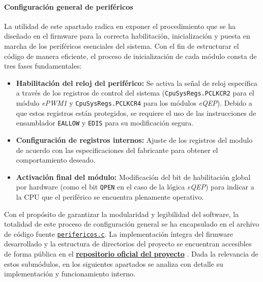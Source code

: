\documentclass[11pt,fleqn]{book} %
\begin{document}
\paragraph{Configuración general de periféricos}

La utilidad de este apartado radica en exponer el procedimiento que se ha diseñado en el firmware para la correcta habilitación, inicialización y puesta en marcha de los periféricos esenciales del sistema. Con el fin de estructurar el código de manera eficiente, el proceso de inicialización de cada módulo consta de tres fases fundamentales:

\begin{itemize}
	\item \textbf{Habilitación del reloj del periférico:} Se activa la señal de reloj específica a través de los registros de control del sistema (\texttt{CpuSysRegs.PCLKCR2} para el módulo \textit{ePWM1} y \texttt{CpuSysRegs.PCLKCR4} para los módulos \textit{eQEP}). Debido a que estos registros están protegidos, se requiere el uso de las instrucciones de ensamblador \texttt{EALLOW} y \texttt{EDIS} para su modificación segura.
	
	\item \textbf{Configuración de registros internos:} Ajuste de los registros del modulo de acuerdo con las especificaciones del fabricante para obtener el comportamiento deseado. 
	
	\item \textbf{Activación final del módulo:} Modificación del bit de habilitación global por hardware (como el bit \texttt{QPEN} en el caso de la lógica \textit{eQEP}) para indicar a la CPU que el periférico se encuentra plenamente operativo.
\end{itemize}

Con el propósito de garantizar la modularidad y legibilidad del software, la totalidad de este proceso de configuración general se ha encapsulado en el archivo de código fuente \href{https://github.com/MPV247/TFG_Control_MiguelPorcar/blob/main/firmware_C2000/f280049c_ws/control/src/perifericos.c}{\texttt{perifericos.c}}. La implementación íntegra del firmware desarrollado y la estructura de directorios del proyecto se encuentran accesibles de forma pública en el \href{https://github.com/MPV247/TFG_Control_MiguelPorcar}{\textbf{repositorio oficial del proyecto}} \cite{Porcar2026TFG}. Dada la relevancia de estos submódulos, en los siguientes apartados se analiza con detalle su implementación y funcionamiento interno.
\end{document}

